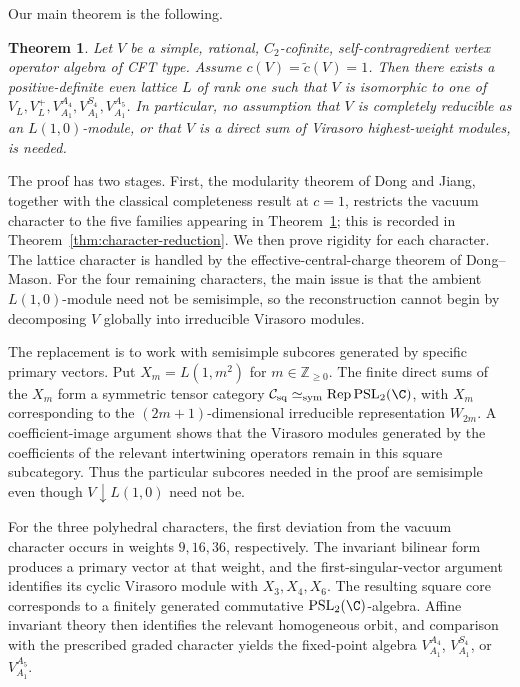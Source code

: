 \documentclass[12pt,leqno]{amsart}
\numberwithin{equation}{section} \newtheorem{thm}{Theorem}[section] \newtheorem{lem}[thm]{Lemma} \newtheorem{ex}[thm]{Example} \newtheorem{prop}[thm]{Proposition} \newtheorem{cor}[thm]{Corollary} \newtheorem{defi}[thm]{Definition} \newtheorem{rmk}[thm]{Remark} \newtheorem{notation}[thm]{Notation}
\newcommand{\Rep}{\operatorname{Rep}}
\newcommand{\Csq}{\mathcal C_{\mathrm{sq}}}
\newcommand{\PSLtwo}{\operatorname{PSL}_2(\C)}
\begin{document}
Our main theorem is the following.

\begin{thm}\label{thm:main}
Let $V$ be a simple, rational, $C_2$-cofinite, self-contragredient vertex operator algebra of CFT type. Assume $c(V)=\widetilde c(V)=1$. Then there exists a positive-definite even lattice $L$ of rank one such that $V$ is isomorphic to one of $V_L,V_L^+,V_{A_1}^{A_4},V_{A_1}^{S_4},V_{A_1}^{A_5}$. In particular, no assumption that $V$ is completely reducible as an $L(1,0)$-module, or that $V$ is a direct sum of Virasoro highest-weight modules, is needed.
\end{thm}

The proof has two stages. First, the modularity theorem of Dong and Jiang, together with the classical completeness result at $c=1$, restricts the vacuum character to the five families appearing in Theorem~\ref{thm:main}; this is recorded in Theorem~\ref{thm:character-reduction}. We then prove rigidity for each character. The lattice character is handled by the effective-central-charge theorem of Dong--Mason. For the four remaining characters, the main issue is that the ambient $L(1,0)$-module need not be semisimple, so the reconstruction cannot begin by decomposing $V$ globally into irreducible Virasoro modules.

The replacement is to work with semisimple subcores generated by specific primary vectors. Put $X_m=L(1,m^2)$ for $m\in\mathbb Z_{\ge0}$. The finite direct sums of the $X_m$ form a symmetric tensor category $\Csq\simeq_{\mathrm{sym}}\Rep\PSLtwo$, with $X_m$ corresponding to the $(2m+1)$-dimensional irreducible representation $W_{2m}$. A coefficient-image argument shows that the Virasoro modules generated by the coefficients of the relevant intertwining operators remain in this square subcategory. Thus the particular subcores needed in the proof are semisimple even though $V\downarrow L(1,0)$ need not be.

For the three polyhedral characters, the first deviation from the vacuum character occurs in weights $9,16,36$, respectively. The invariant bilinear form produces a primary vector at that weight, and the first-singular-vector argument identifies its cyclic Virasoro module with $X_3,X_4,X_6$. The resulting square core corresponds to a finitely generated commutative $\PSLtwo$-algebra. Affine invariant theory then identifies the relevant homogeneous orbit, and comparison with the prescribed graded character yields the fixed-point algebra $V_{A_1}^{A_4}$, $V_{A_1}^{S_4}$, or $V_{A_1}^{A_5}$.
\end{document}
